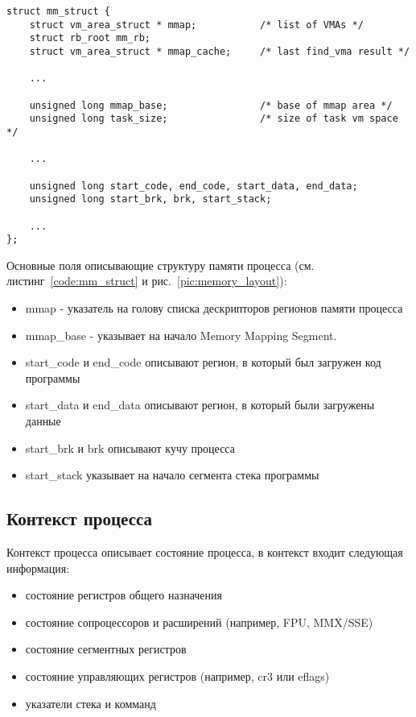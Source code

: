 \begin{lstlisting}[caption=Выборка из структуры struct mm\_struct, label=code:mm_struct]
struct mm_struct {
    struct vm_area_struct * mmap;           /* list of VMAs */
    struct rb_root mm_rb;
    struct vm_area_struct * mmap_cache;     /* last find_vma result */

    ...

    unsigned long mmap_base;                /* base of mmap area */
    unsigned long task_size;                /* size of task vm space */

    ...

    unsigned long start_code, end_code, start_data, end_data;
    unsigned long start_brk, brk, start_stack;

    ...
};
\end{lstlisting}

Основные поля описывающие структуру памяти процесса (см. листинг~\ref{code:mm_struct} и рис.~\ref{pic:memory_layout}):

\begin{itemize}

    \item mmap - указатель на голову списка дескрипторов регионов памяти процесса
    \item mmap\_base - указывает на начало Memory Mapping Segment.
    \item start\_code и end\_code описывают регион, в который был загружен код программы
    \item start\_data и end\_data описывают регион, в который были загружены данные
    \item start\_brk и brk описывают кучу процесса
    \item start\_stack указывает на начало сегмента стека программы

\end{itemize}

\subsection{Контекст процесса}

Контекст процесса описывает состояние процесса, в контекст входит следующая информация:

\begin{itemize}

    \item состояние регистров общего назначения
    \item состояние сопроцессоров и расширений (например, FPU, MMX/SSE)
    \item состояние сегментных регистров
    \item состояние управляющих регистров (например, cr3 или eflags)
    \item указатели стека и комманд

\end{itemize}

